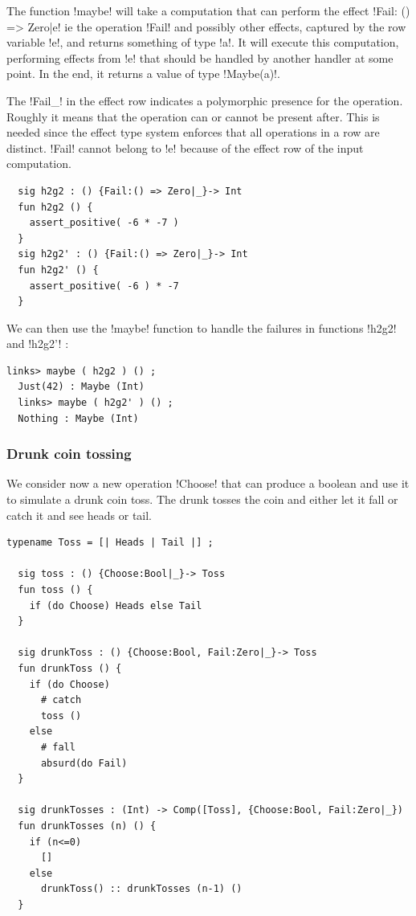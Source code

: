 \documentclass[10pt, nonacm=true, language=french, language=english]{acmart}
\begin{document}
The function !maybe! will take a computation that can perform the effect !{Fail: () => Zero|e}! ie the operation !Fail! and possibly other effects, captured by the row variable !e!, and returns something of type !a!. It will execute this computation, performing effects from !e! that should be handled by another handler at some point. In the end, it returns a value of type !Maybe(a)!.

The !Fail{_}! in the effect row indicates a polymorphic presence for the operation. Roughly it means that the operation can or cannot be present after. This is needed since the effect type system enforces that all operations in a row are distinct. !Fail! cannot belong to !e! because of the effect row of the input computation.

\begin{lstlisting}
  sig h2g2 : () {Fail:() => Zero|_}-> Int
  fun h2g2 () {
    assert_positive( -6 * -7 )
  }
  sig h2g2' : () {Fail:() => Zero|_}-> Int
  fun h2g2' () {
    assert_positive( -6 ) * -7
  }
\end{lstlisting}

We can then use the !maybe! function to handle the failures in functions !h2g2! and !h2g2'! :

\begin{lstlisting}[caption=Links console]
  links> maybe ( h2g2 ) () ;
  Just(42) : Maybe (Int)
  links> maybe ( h2g2' ) () ;
  Nothing : Maybe (Int)
\end{lstlisting}


\subsubsection{Drunk coin tossing}

We consider now a new operation !Choose! that can produce a boolean and use it to simulate a drunk coin toss. The drunk tosses the coin and either let it fall or catch it and see heads or tail.

\begin{lstlisting}[caption=Drunk toss]
  typename Toss = [| Heads | Tail |] ;

  sig toss : () {Choose:Bool|_}-> Toss
  fun toss () {
    if (do Choose) Heads else Tail
  }

  sig drunkToss : () {Choose:Bool, Fail:Zero|_}-> Toss
  fun drunkToss () {
    if (do Choose)
      # catch
      toss ()
    else
      # fall
      absurd(do Fail)
  }

  sig drunkTosses : (Int) -> Comp([Toss], {Choose:Bool, Fail:Zero|_})
  fun drunkTosses (n) () {
    if (n<=0)
      []
    else
      drunkToss() :: drunkTosses (n-1) ()
  }
\end{lstlisting}
\end{document}
